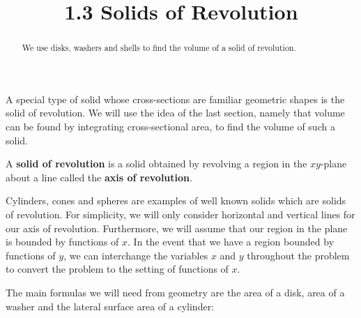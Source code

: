 \documentclass{ximera}
\title{1.3 Solids of Revolution}
\begin{document}
\begin{abstract}
We use disks, washers and shells to find the volume of a solid of revolution.
\end{abstract}

\maketitle

A special type of solid whose cross-sections are familiar geometric shapes is the solid of revolution. 
We will use the idea of the last section, namely that volume can be found by integrating cross-sectional area, 
to find the volume of such a solid.  

\begin{definition} A \textbf{solid of revolution} is a solid obtained by revolving a region in the
 $xy$-plane about a line called the \textbf{axis of revolution}.
\end{definition}

Cylinders, cones and spheres are examples of well known solids which are solids of revolution. 
For simplicity, we will only consider horizontal and vertical lines for our axis of revolution.  
Furthermore, we will assume that our region in the plane is bounded by functions of $x$.  
In the event that we have a region bounded by functions of $y$, we can interchange the 
variables $x$ and $y$ throughout the problem to convert the problem to the setting of functions of $x$.

The main formulas we will need from geometry are the area of a disk, area of a washer and 
the lateral surface area of a cylinder:
\end{document}
